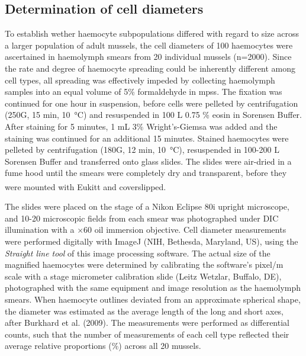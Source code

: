 \subsection{Determination of cell diameters}
\label{subsection:CytCar}
To establish wether haemocyte subpopulations differed with regard to size across a larger population of adult mussels, the cell diameters of 100 haemocytes were ascertained in haemolymph smears from 20 individual mussels (n=2000). Since the rate and degree of haemocyte spreading could be inherently different among cell types, all spreading was effectively impeded by collecting haemolymph samples into an equal volume of 5\% formaldehyde in \acrshort{mpss}. The fixation was continued for one hour in suspension, before cells were pelleted by centrifugation (250G, 15 min, \SI{10}{\celsius}) and resuspended in 100 \micro L 0.75 \% eosin in Sorensen Buffer. After staining for 5 minutes, 1 mL 3\% Wright’s-Giemsa was added and the staining was continued for an additional 15 minutes. Stained haemocytes were pelleted by centrifugation (180G, 12 min, \SI{10}{\celsius}), resuspended in 100-200 \micro L Sorensen Buffer and transferred onto glass slides. The slides were air-dried in a fume hood until the smears were completely dry and transparent, before they were mounted with Eukitt\textsuperscript{\textregistered} and coverslipped.

The slides were placed on the stage of a Nikon Eclipse 80i upright microscope, and 10-20 microscopic fields from each smear was photographed under DIC illumination with a $\times$60 oil immersion objective. Cell diameter measurements were performed digitally with ImageJ (NIH, Bethesda, Maryland, US), using the \emph{Straight line tool} of this image processing software. The actual size of the magnified haemocytes were determined by calibrating the software's pixel/\micro m scale with a stage micrometer calibration slide (Leitz Wetzlar, Buffalo, DE), photographed with the same equipment and image resolution as the haemolymph smears. When haemocyte outlines deviated from an approximate spherical shape, the diameter was estimated as the average length of the long and short axes, after Burkhard et al. (2009). The measurements were performed as differential counts, such that the number of measurements of each cell type reflected their average relative proportions (\%) across all 20 mussels.

